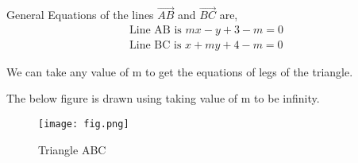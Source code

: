 \documentclass[journal,12pt,twocolumn]{IEEEtran}
\begin{document}
General Equations of the lines $\vec{AB}$ and $\vec{BC}$ are,
\begin{align}
    \text{Line AB is } mx-y+3-m=0 \\
    \text{Line BC is } x+my+4-m=0
\end{align}

We can take any value of m to get the equations of legs of the triangle.

The below figure is drawn using taking value of m to be infinity.

\begin{figure}[!h]
    \centering
    \texttt{[image: fig.png]}
    \caption{Triangle ABC}
    \label{triangle}
\end{figure}
\end{document}
